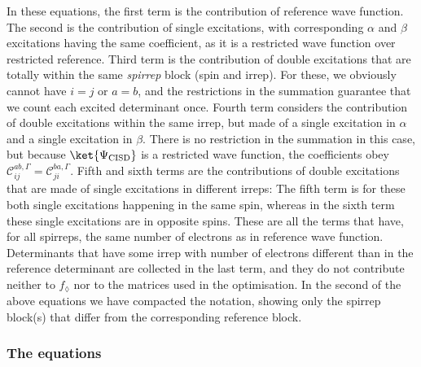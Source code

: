 \documentclass[a4paper,11pt]{article}
\newcommand{\Dss}{\ensuremath{\mathcal{C}}}
\newcommand{\irp}{\ensuremath{\Gamma}}
\begin{document}
In these equations, the first term is the contribution of reference wave function.
The second is the contribution of single excitations, with corresponding $\alpha$ and $\beta$ excitations having the same coefficient, as it is a restricted wave function over restricted reference.
Third term is the contribution of double excitations that are totally within the same \emph{spirrep} block (spin and irrep). For these, we obviously cannot have $i=j$ or $a=b$, and the restrictions in the summation guarantee that we count each excited determinant once.
Fourth term considers the contribution of double excitations within the same irrep, but made of a single excitation in $\alpha$ and a single excitation in $\beta$.
There is no restriction in the summation in this case, but because $\ket{\Psi_\text{CISD}}$ is a restricted wave function, the coefficients obey $\Dss_{ij}^{ab, \irp} =  \Dss_{ji}^{ba, \irp}$.
Fifth and sixth terms are the contributions of double excitations that are made of single excitations in different irreps:
The fifth term is for these both single excitations happening in the same spin, whereas in the sixth term these single excitations are in opposite spins.
These are all the terms that have, for all spirreps, the same number of electrons as in reference wave function.
Determinants that have some irrep with number of electrons different than in the reference determinant are collected in the last term, and they do not contribute neither to $f_\lozenge$ nor to the matrices used in the optimisation.
In the second of the above equations we have compacted the notation, showing only the spirrep block(s) that differ from the corresponding reference block. 

\subsubsection{The equations}
\end{document}
